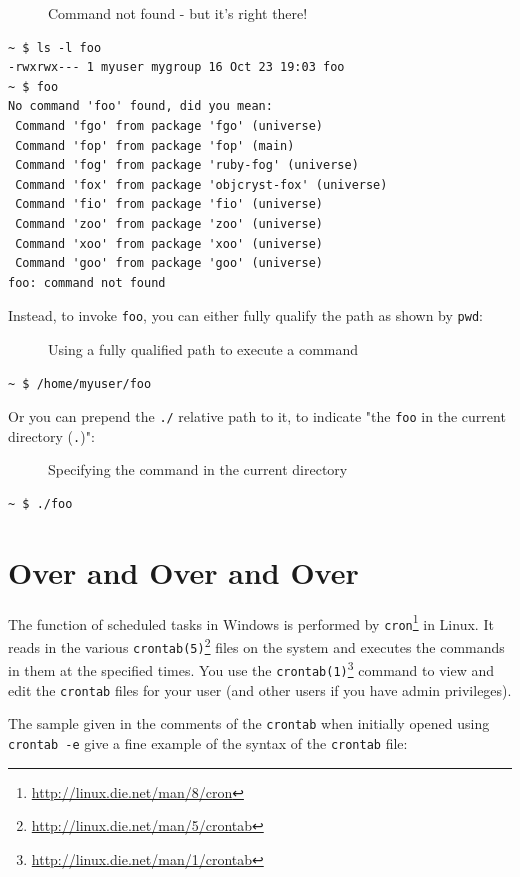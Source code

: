 \documentclass[10pt,]{book}
\renewcommand{\href}[2]{#2\footnote{\url{#1}}}
\numberwithin{figure}{chapter}
\DeclareRobustCommand{\drcap}[1]{\begin{figure}[H]\caption{#1}\end{figure}}
\DeclareRobustCommand{\drcmd}[1]{\index{Commands!#1}}
\begin{document}
\drcap{Command not found - but it's right there!}

\begin{verbatim}
~ $ ls -l foo
-rwxrwx--- 1 myuser mygroup 16 Oct 23 19:03 foo
~ $ foo
No command 'foo' found, did you mean:
 Command 'fgo' from package 'fgo' (universe)
 Command 'fop' from package 'fop' (main)
 Command 'fog' from package 'ruby-fog' (universe)
 Command 'fox' from package 'objcryst-fox' (universe)
 Command 'fio' from package 'fio' (universe)
 Command 'zoo' from package 'zoo' (universe)
 Command 'xoo' from package 'xoo' (universe)
 Command 'goo' from package 'goo' (universe)
foo: command not found
\end{verbatim}

Instead, to invoke \texttt{foo}, you can either fully qualify the path
as shown by \texttt{pwd}:

\drcap{Using a fully qualified path to execute a command}

\begin{verbatim}
~ $ /home/myuser/foo
\end{verbatim}

Or you can prepend the \texttt{./} relative path to it, to indicate "the
\texttt{foo} in the current directory (\texttt{.})":

\drcap{Specifying the command in the current directory}

\begin{verbatim}
~ $ ./foo
\end{verbatim}

\section*{Over and Over and Over}\label{over-and-over-and-over}

The function of scheduled tasks in Windows is performed by
\href{http://linux.die.net/man/8/cron}{\texttt{cron}}\drcmd{cron} in
Linux. It reads in the various
\href{http://linux.die.net/man/5/crontab}{\texttt{crontab(5)}}
files on the system and executes the commands in them at the specified
times. You use the
\href{http://linux.die.net/man/1/crontab}{\texttt{crontab(1)}}\drcmd{crontab}
command to view and edit the \texttt{crontab} files for your user (and
other users if you have admin privileges).

The sample given in the comments of the \texttt{crontab} when initially
opened using \texttt{crontab -e} give a fine example of the syntax of
the \texttt{crontab} file:
\end{document}
